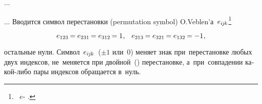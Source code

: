 ...

\begin{otherlanguage}{russian}

... Вводится символ перестановки (permutation symbol) \hbox{O.\hspace{.12ex}Veblen’а}~${e_{i\hspace{-0.1ex}j\hspace{-0.1ex}k}}$\footnote{%
 ~$e$\hbox{\hspace{.16ex}-\hspace{.16ex}}  .}

\nopagebreak\vspace{-0.3em}\begin{equation*}
e_{123} \hspace{-0.15ex}= e_{231} \hspace{-0.15ex}= e_{312} \hspace{-0.15ex}= 1
\hspace{.1ex} ,
\hspace{1.8ex}
e_{213} \hspace{-0.15ex}= e_{321} \hspace{-0.15ex}= e_{132} \hspace{-0.15ex}= -1
\hspace{.1ex} ,
\vspace{-0.25em}\end{equation*}

\nopagebreak \noindent остальные нули.
Символ~${e_{i\hspace{-0.1ex}j\hspace{-0.1ex}k}}$~(${\pm 1}$ или~$0$) меняет знак при~перестановке любых двух индексов, не~меняется при двойной~() перестановке, а~при~совпадении какой\hbox{-}либо пары индексов обращается в~нуль.

\vspace{1mm}

\begin{tcolorbox}[enhanced, colback = green!16, before upper={\parindent2ex}, parbox = false]
\small%
\setlength{\abovedisplayskip}{2pt}\setlength{\belowdisplayskip}{2pt}%


\end{tcolorbox}
\end{otherlanguage}
